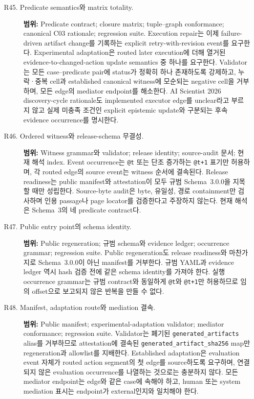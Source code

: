 \documentclass[11pt]{article}
\begin{document}
\begin{description}
  \item[R45. Predicate semantics와 matrix totality.]
  \textbf{범위:} Predicate contract; closure matrix; tuple--graph conformance; canonical C03 rationale; regression suite.
  Execution repair는 이제 failure-driven artifact change를 기록하는 explicit retry-with-revision event를 요구한다. Experimental adaptation은 routed later execution에 더해 열거된 evidence-to-changed-action update semantics 중 하나를 요구한다. Validator는 모든 case--predicate pair에 status가 정확히 하나 존재하도록 강제하고, 누락·중복 cell과 established canonical witness에 모순되는 negative cell을 거부하며, 모든 edge의 mediator endpoint를 해소한다. AI Scientist 2026 discovery-cycle rationale도 implemented executor edge를 unclear라고 부르지 않고 실제 미충족 조건인 explicit epistemic update와 구분되는 후속 evidence occurrence를 명시한다.
  \item[R46. Ordered witness와 release-schema 무결성.]
  \textbf{범위:} Witness grammar와 validator; release identity; source-audit 문서; 현재 해석 index.
  Event occurrence는 \texttt{@t} 또는 단조 증가하는 \texttt{@t+1} 표기만 허용하며, 각 routed edge의 source event는 witness 순서에 결속된다. Release readiness는 public manifest와 attestation이 모두 규범 Schema~3.0.0을 지목할 때만 성립한다. Source-byte audit은 byte, 유일성, 경로 containment만 검사하며 인용 passage나 page locator를 검증한다고 주장하지 않는다. 현재 해석은 Schema~3의 네 predicate contract다.
  \item[R47. Public entry point의 schema identity.]
  \textbf{범위:} Public regeneration; 규범 schema와 evidence ledger; occurrence grammar; regression suite.
  Public regeneration도 release readiness와 마찬가지로 Schema~3.0.0이 아닌 manifest를 거부한다. 규범 YAML과 evidence ledger 역시 hash 검증 전에 같은 schema identity를 가져야 한다. 실행 occurrence grammar는 규범 contract와 동일하게 \texttt{@t}와 \texttt{@t+1}만 허용하므로 임의 offset으로 보고되지 않은 반복을 만들 수 없다.
  \item[R48. Manifest, adaptation route와 mediation 결속.]
  \textbf{범위:} Public manifest; experimental-adaptation validator; mediator conformance; regression suite.
  Validator는 폐기된 \texttt{generated\_artifacts} alias를 거부하므로 attestation에 결속된 \texttt{generated\_artifact\_sha256} map만 regeneration과 allowlist를 지배한다. Established adaptation은 evaluation event 자체가 routed action segment의 첫 edge를 source하도록 요구하며, 연결되지 않은 evaluation occurrence를 나열하는 것으로는 충분하지 않다. 모든 mediator endpoint는 edge와 같은 case에 속해야 하고, human 또는 system mediation 표시는 endpoint가 external인지와 일치해야 한다.

\end{description}
\end{document}
